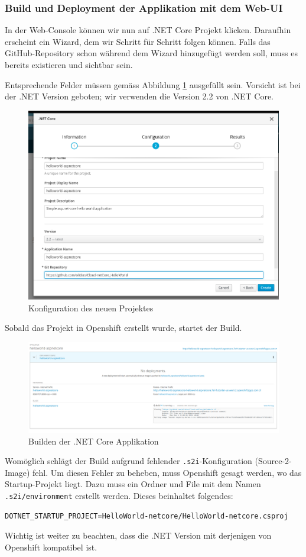 \documentclass[12pt,a4paper]{article}
\begin{document}
\subsubsection{Build und Deployment der Applikation mit dem Web-UI}\label{sec:net-webui}
In der Web-Console können wir nun auf .NET Core Projekt klicken. Daraufhin erscheint ein Wizard, dem wir Schritt für Schritt folgen können. Falls das GitHub-Repository schon während dem Wizard hinzugefügt werden soll, muss es bereits existieren und sichtbar sein. 

Entsprechende Felder müssen gemäss Abbildung \ref{fig:os-new-config} ausgefüllt sein. Vorsicht ist bei der .NET Version geboten; wir verwenden die Version 2.2 von .NET Core. 
\begin{figure}[h]
	\centering
	\includegraphics[width=0.7\linewidth]{img/os-new-config}
	\caption{Konfiguration des neuen Projektes}
	\label{fig:os-new-config}
\end{figure}

Sobald das Projekt in Openshift erstellt wurde, startet der Build. 
\begin{figure}[h]
	\centering
	\includegraphics[width=0.7\linewidth]{img/os-building}
	\caption{Builden der .NET Core Applikation}
	\label{fig:os-building}
\end{figure}
Womöglich schlägt der Build aufgrund fehlender \texttt{.s2i}-Konfiguration (Source-2-Image) fehl. Um diesen Fehler zu beheben, muss Openshift gesagt werden, wo das Startup-Projekt liegt. Dazu muss ein Ordner und File mit dem Namen \texttt{.s2i/environment} erstellt werden. Dieses beinhaltet folgendes:
\begin{lstlisting}[breaklines=true]
DOTNET_STARTUP_PROJECT=HelloWorld-netcore/HelloWorld-netcore.csproj
\end{lstlisting}
Wichtig ist weiter zu beachten, dass die .NET Version mit derjenigen von Openshift kompatibel ist.
\end{document}
